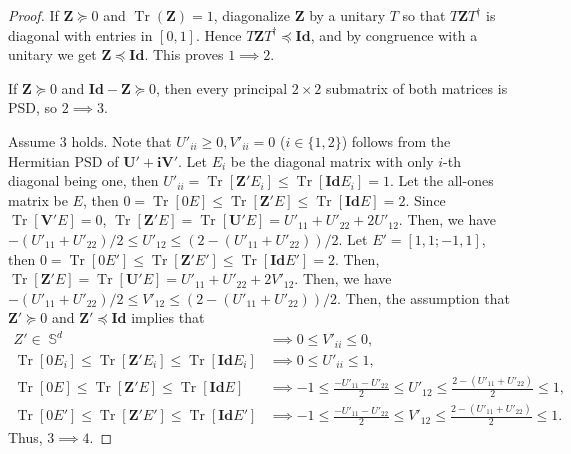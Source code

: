 \documentclass[smallextended]{svjour3}
\newcommand{\Z}{\mathbf{Z}}
\newcommand{\1}{\mathbf{1}}
\newcommand{\U}{\mathbf{U}}
\newcommand{\V}{\mathbf{V}}
\newcommand{\Id}{\mathbf{Id}}
\newcommand{\vi}{\mathbf{i}}
\DeclareMathOperator{\herm}{\mathbb{S}}
\DeclareMathOperator{\tr}{Tr}
\begin{document}
\begin{proof}
If $\Z\succeq0$ and $\tr(\Z)=1$, diagonalize $\Z$ by a unitary $T$ so that $T\Z T^\dagger$ is diagonal with entries in $[0,1]$. Hence $T\Z T^\dagger \preceq \Id$, and by congruence with a unitary we get $\Z \preceq \Id$. This proves $1\!\implies\!2$.

If $\Z \succeq 0$ and $\Id-\Z\succeq0$, then every principal $2\times2$ submatrix of both matrices is PSD, so $2\!\implies\!3$.

Assume $3$ holds.  Note that  $U'_{ii} \ge 0, V'_{ii} = 0$ ($i \in \{1,2\}$) follows from the Hermitian PSD of $\U'+\vi \V'$. Let $E_i$ be the diagonal matrix with only $i$-th diagonal being one, then $ U'_{ii} = \tr[\Z' E_i ] \le \tr[\Id E_i] = 1$. Let the all-ones matrix be $E$, then $0  = \tr[0  E] \le  \tr[\Z' E]   \le \tr[\Id  E]  =  2 $. Since $\tr[\V'  E] = 0$, $ \tr[\Z' E]   = \tr[\U' E]   =  U'_{11} + U'_{22} + 2 U'_{12}  $. Then, we have $-(U'_{11} + U'_{22}) /2 \le   U'_{12} \le (2 - (U'_{11} + U'_{22}))/2$. Let  $E'=[1, 1; -1, 1]$, then $0  = \tr[0  E'] \le  \tr[\Z' E']   \le \tr[\Id  E']  =  2 $. Then, $ \tr[\Z' E]   = \tr[\U' E]   =  U'_{11} + U'_{22} + 2 V'_{12}  $. Then, we have $-(U'_{11} + U'_{22}) /2 \le   V'_{12} \le (2 - (U'_{11} + U'_{22}))/2$. Then, the assumption that $\Z' \succeq 0$ and $\Z' \preceq \Id$ implies that
    \begin{equation}
    \label{eq.implieq}
            \begin{split}
            Z' \in \herm^d & \implies 0 \le V'_{ii} \le 0, \\
                \tr[0  E_i] \le \tr[\Z' E_i]   \le   \tr[\Id  E_i]  & \implies   0 \le   U'_{ii} \le 1, \\
    \tr[0  E] \le \tr[\Z' E]   \le   \tr[\Id  E]  & \implies  -1 \le  \frac{-U'_{11} - U'_{22}}{2} \le   U'_{12} \le \frac{2 - (U'_{11} + U'_{22})}{2} \le 1, \\
  \tr[0  E'] \le \tr[\Z' E']   \le \tr[\Id  E']   & \implies -1 \le \frac{-U'_{11} - U'_{22}}{2} \le   V'_{12} \le \frac{2 - (U'_{11} + U'_{22})}{2}  \le 1.
    \end{split}
    \end{equation}
     Thus, $3 \implies 4$.
\end{proof}
\end{document}
